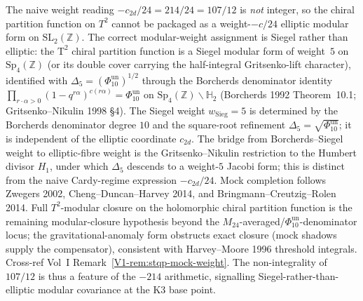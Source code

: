 \begin{remark}
\label{rem:anomtop-T2-modular}
The naive weight reading $-c_{2d}/24 = 214/24 = 107/12$ is
\emph{not} integer, so the chiral partition function on $T^2$
cannot be packaged as a weight-$-c/24$ elliptic modular form on
$\mathrm{SL}_2(\mathbb Z)$. The correct modular-weight assignment
is Siegel rather than elliptic: the
$\mathrm T^2$ chiral partition function is a Siegel modular form
of weight~$5$ on $\mathrm{Sp}_4(\mathbb Z)$ (or its double cover
carrying the half-integral Gritsenko-lift character), identified
with $\Delta_5 = (\Phi_{10}^{\mathrm{un}})^{1/2}$ through the Borcherds denominator
identity
$\prod_{r\cdot\alpha>0}(1-q^{r\alpha})^{c(r\alpha)} = \Phi_{10}^{\mathrm{un}}$
on $\mathrm{Sp}_4(\mathbb Z)\backslash\mathbb H_2$ (Borcherds 1992
Theorem~10.1; Gritsenko--Nikulin 1998 \S 4). The Siegel weight
$w_{\mathrm{Sieg}} = 5$ is determined by the Borcherds denominator
degree $10$ and the square-root refinement
$\Delta_5 = \sqrt{\Phi_{10}^{\mathrm{un}}}$; it is independent of the elliptic
coordinate $c_{2d}$. The bridge from Borcherds--Siegel weight to
elliptic-fibre weight is the Gritsenko--Nikulin restriction to the
Humbert divisor $H_1$, under which $\Delta_5$ descends to a
weight-$5$ Jacobi form; this is distinct from the naive
Cardy-regime expression $-c_{2d}/24$. Mock completion follows
Zwegers 2002, Cheng--Duncan--Harvey 2014, and
Bringmann--Creutzig--Rolen 2014. Full $T^2$-modular closure on
the holomorphic chiral partition function is the remaining
modular-closure hypothesis beyond the
$M_{24}$-averaged/$\Phi_{10}^{\mathrm{un}}$-denominator locus; the
gravitational-anomaly form obstructs exact closure (mock shadows
supply the compensator), consistent with Harvey--Moore 1996
threshold integrals. Cross-ref Vol~I
Remark~\ref{V1-rem:stqp-mock-weight}. The non-integrality of
$107/12$ is thus a feature of the $-214$ arithmetic, signalling
Siegel-rather-than-elliptic modular covariance at the K3 base
point.
\end{remark}

